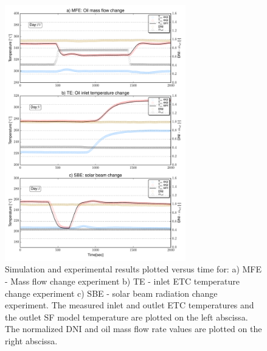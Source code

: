 \documentclass[final,3p,times,review]{elsarticle}
\begin{document}
%
\begin{figure}[h!]
\centering
\includegraphics[width=0.7\textwidth]{Figures/_MassFlowChange.pdf}
\caption{Simulation and experimental results plotted versus time for: a) MFE - Mass flow change experiment  b) TE - inlet ETC temperature change experiment c) SBE - solar beam radiation change experiment. The measured inlet and outlet ETC temperatures and the outlet SF model temperature are plotted on the left abscissa. The normalized DNI and oil mass flow rate values are plotted on the right abscissa.}
\label{fig:SF_ModRes_Zoomed}
\end{figure}
%
%
\end{document}
